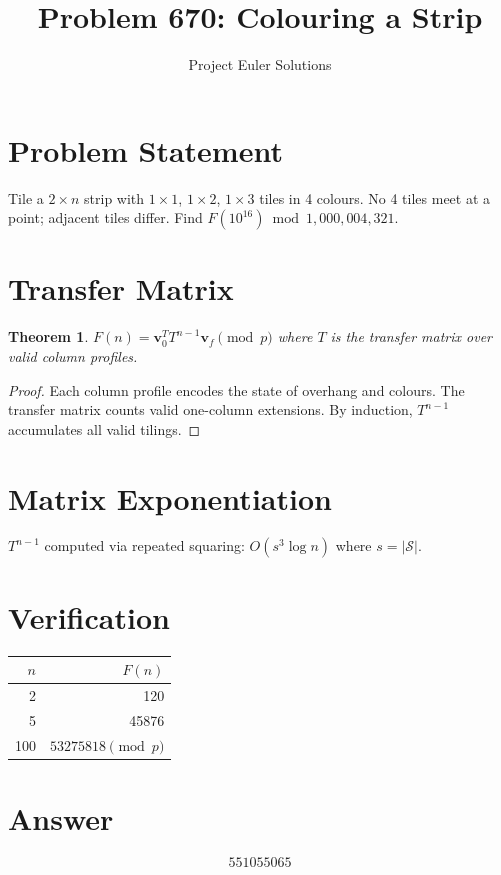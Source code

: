 \documentclass[11pt]{article}
\title{Problem 670: Colouring a Strip}
\author{Project Euler Solutions}
\date{}
\newtheorem{theorem}{Theorem}
\begin{document}
\maketitle

\section{Problem Statement}

Tile a $2 \times n$ strip with $1\times 1$, $1\times 2$, $1\times 3$ tiles in 4 colours. No 4 tiles meet at a point; adjacent tiles differ. Find $F(10^{16}) \bmod 1{,}000{,}004{,}321$.

\section{Transfer Matrix}

\begin{theorem}
$F(n) = \mathbf{v}_0^T T^{n-1} \mathbf{v}_f \pmod{p}$ where $T$ is the transfer matrix over valid column profiles.
\end{theorem}

\begin{proof}
Each column profile encodes the state of overhang and colours. The transfer matrix counts valid one-column extensions. By induction, $T^{n-1}$ accumulates all valid tilings.
\end{proof}

\section{Matrix Exponentiation}

$T^{n-1}$ computed via repeated squaring: $O(s^3 \log n)$ where $s = |\mathcal{S}|$.

\section{Verification}

\begin{center}
\begin{tabular}{rr}
\toprule
$n$ & $F(n)$ \\
\midrule
2 & 120 \\
5 & 45876 \\
100 & $53275818 \pmod{p}$ \\
\bottomrule
\end{tabular}
\end{center}

\section{Answer}

\[
\boxed{551055065}
\]
\end{document}
